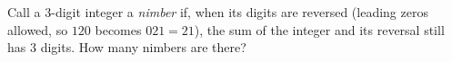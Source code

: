 Call a $3$-digit integer a \emph{nimber} if, when its digits are reversed (leading zeros allowed, so $120$ becomes $021=21$), the sum of the integer and its reversal still has $3$ digits. How many nimbers are there?
